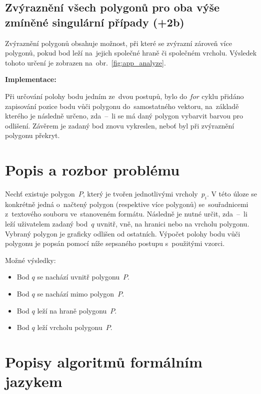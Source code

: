 \documentclass[a4paper, 12pt, oneside, titlepage]{article} %
\begin{document}
\subsection{Zvýraznění všech polygonů pro oba výše zmíněné singulární případy (+2b)}
Zvýraznění polygonů obsahuje možnost, při které se zvýrazní zároveň více polygonů, pokud bod leží na~jejich společné hraně či společném vrcholu. Výsledek tohoto určení je zobrazen na~obr.~\ref{fig:app_analyze}.

\noindent\textbf{Implementace:}

Při určování polohy bodu jedním ze~dvou postupů, bylo do $for$ cyklu přidáno zapisování pozice bodu vůči polygonu do~samostatného vektoru, na~základě kterého je následně určeno, zda~--~li se má daný polygon vybarvit barvou pro odlišení. Závěrem je zadaný bod znovu vykreslen, neboť byl při zvýraznění polygonu překryt. 


\section{Popis a rozbor problému}
Nechť existuje polygon~$P$, který je tvořen jednotlivými vrcholy~$p_i$. V této úloze se konkrétně jedná o~načtený polygon (respektive více polygonů) se~souřadnicemi z~textového souboru ve~stanoveném formátu. Následně je nutné určit, zda~--~li leží uživatelem zadaný bod~$q$ uvnitř, vně, na hranici nebo na vrcholu polygonu. Vybraný polygon je graficky odlišen od ostatních. Výpočet polohy bodu vůči polygonu je popsán pomocí níže sepsaného postupu s~použitými vzorci.

Možné výsledky:
\begin{itemize}
\item Bod $q$ se nachází uvnitř polygonu~$P$.
\item Bod $q$ se nachází mimo polygon~$P$.
\item Bod $q$ leží na hraně polygonu~$P$.
\item Bod $q$ leží vrcholu polygonu~$P$.
\end{itemize}


\section{Popisy algoritmů formálním jazykem}
\end{document}
